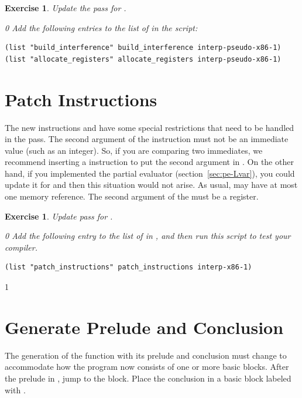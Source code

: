 \documentclass[7x10]{TimesAPriori_MIT}%
\def\racketEd{0}
\def\pythonEd{1}
\def\edition{1}
\newcommand{\pythonColor}[0]{}
\newtheorem{exercise}[theorem]{Exercise}
\numberwithin{theorem}{chapter}
\numberwithin{definition}{chapter}
\numberwithin{equation}{chapter}
\begin{document}
\begin{exercise}\normalfont\normalsize
Update the  pass for \LangXIfVar{}.
{\if\edition\racketEd
Add the following entries to the list of  in the
 script:
\begin{lstlisting}
(list "build_interference" build_interference interp-pseudo-x86-1)
(list "allocate_registers" allocate_registers interp-pseudo-x86-1)
\end{lstlisting}
\fi}
\end{exercise}


\section{Patch Instructions}

The new instructions  and  have some special
restrictions that need to be handled in the 
pass.
%
The second argument of the  instruction must not be an
immediate value (such as an integer). So, if you are comparing two
immediates, we recommend inserting a  instruction to put the
second argument in . On the other hand, if you implemented
the partial evaluator (section~\ref{sec:pe-Lvar}), you could
update it for \LangIf{} and then this situation would not arise.
%
As usual,  may have at most one memory reference.
%
The second argument of the  must be a register.

\begin{exercise}\normalfont\normalsize
%
Update  pass for \LangXIfVar{}.
%  
{\if\edition\racketEd
Add the following entry to the list of  in
, and then run this script to test your compiler.
\begin{lstlisting}
(list "patch_instructions" patch_instructions interp-x86-1)
\end{lstlisting}
\fi}
\end{exercise}


{\if\edition\pythonEd\pythonColor
  
\section{Generate Prelude and Conclusion}
\label{sec:prelude-conclusion-cond}

The generation of the  function with its prelude and
conclusion must change to accommodate how the program now consists of
one or more basic blocks. After the prelude in , jump to
the  block. Place the conclusion in a basic block labeled
with .

\fi}
\end{document}
